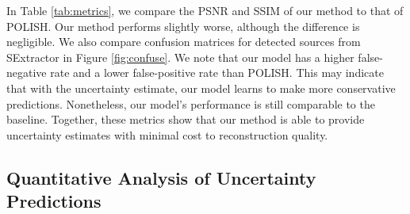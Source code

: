 \documentclass{article}
\begin{document}
In Table \ref{tab:metrics}, we compare the PSNR and SSIM of our method to that of POLISH. Our method performs slightly worse, although the difference is negligible. We also compare confusion matrices for detected sources from SExtractor in Figure \ref{fig:confuse}.  We note that our model has a higher false-negative rate and a lower false-positive rate than POLISH. This may indicate that with the uncertainty estimate, our model learns to make more conservative predictions. Nonetheless, our model's performance is still comparable to the baseline. Together, these metrics show that our method is able to provide uncertainty estimates with minimal cost to reconstruction quality.


\subsection{Quantitative Analysis of Uncertainty Predictions}
\end{document}
